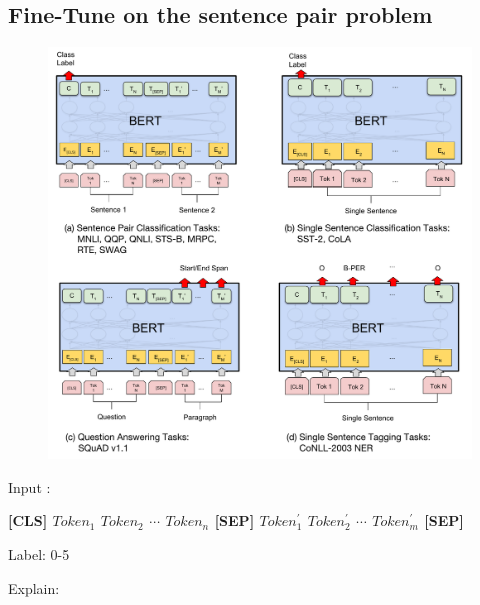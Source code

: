 \documentclass[final,letterpaper,twoside,12pt]{report}
\begin{document}
\newpage

\subsection{Fine-Tune on the sentence pair problem}

\begin{figure}[h]
	\begin{center}
		\includegraphics[trim=0 470 440 0, clip,width=1\textwidth]{BERT_fine_tune.pdf}
	\end{center}
\end{figure}

Input  :

\textbf{[CLS] $Token_1$ $Token_2$ $\cdots$ $Token_n$ [SEP] $Token^{'}_{1}$ $Token^{'}_{2}$ $\cdots$ $Token^{'}_{m}$ [SEP]}

Label: 0-5

Explain:
\end{document}
